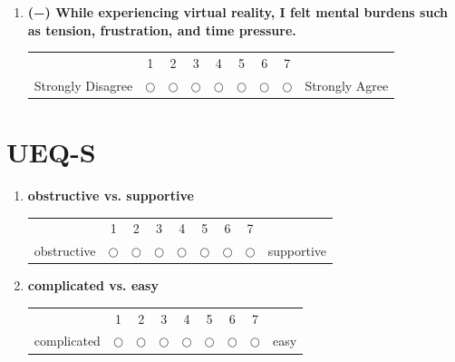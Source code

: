 \documentclass[inscr,ack,preface]{dithesis}
\begin{document}
\begin{appendix}
\begin{enumerate}
    \item \begin{minipage}[t]{\linewidth}
            \textbf{(−) While experiencing virtual reality, I felt mental burdens such as tension, frustration, and time pressure.}
            \begin{center}
              \small
              \renewcommand{\arraystretch}{1.5}
              \begin{tabular}{ccccccccc}
                                  & 1          & 2          & 3          & 4          & 5          & 6          & 7          &                \\
                Strongly Disagree & $\bigcirc$ & $\bigcirc$ & $\bigcirc$ & $\bigcirc$ & $\bigcirc$ & $\bigcirc$ & $\bigcirc$ & Strongly Agree
              \end{tabular}
            \end{center}
          \end{minipage}
  \end{enumerate}

  \section{UEQ-S}
  \begin{enumerate}
    \item \begin{minipage}[t]{\linewidth}
            \textbf{obstructive vs. supportive}
            \begin{center}
              \small
              \renewcommand{\arraystretch}{1.5}
              \begin{tabular}{ccccccccc}
                            & 1          & 2          & 3          & 4          & 5          & 6          & 7          &            \\
                obstructive & $\bigcirc$ & $\bigcirc$ & $\bigcirc$ & $\bigcirc$ & $\bigcirc$ & $\bigcirc$ & $\bigcirc$ & supportive
              \end{tabular}
            \end{center}
          \end{minipage}


    \item \begin{minipage}[t]{\linewidth}
            \textbf{complicated vs. easy}
            \begin{center}
              \small
              \renewcommand{\arraystretch}{1.5}
              \begin{tabular}{ccccccccc}
                            & 1          & 2          & 3          & 4          & 5          & 6          & 7          &      \\
                complicated & $\bigcirc$ & $\bigcirc$ & $\bigcirc$ & $\bigcirc$ & $\bigcirc$ & $\bigcirc$ & $\bigcirc$ & easy
              \end{tabular}
            \end{center}
          \end{minipage}



\end{enumerate}
\end{appendix}
\end{document}

